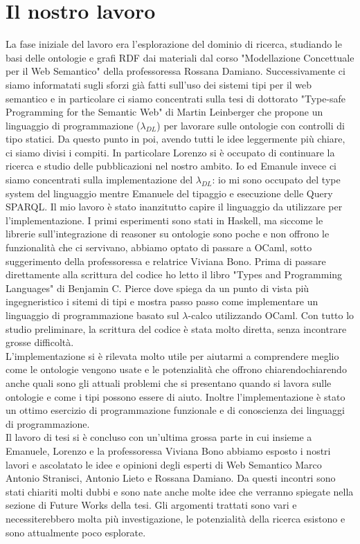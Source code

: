 \section{Il nostro lavoro}
    La fase iniziale del lavoro era l'esplorazione del dominio di ricerca,
    studiando le basi delle ontologie e grafi RDF dai materiali dal corso "Modellazione Concettuale per il Web Semantico" della professoressa Rossana Damiano.
    Successivamente ci siamo informatati sugli sforzi già fatti sull'uso dei sistemi tipi per il web semantico e in particolare ci siamo concentrati sulla tesi di
    dottorato "Type-safe Programming for the Semantic Web" di Martin Leinberger che propone un linguaggio di programmazione ($\lambda_{DL}$) per lavorare sulle ontologie con 
    controlli di tipo statici. Da questo punto in poi, avendo tutti le idee leggermente più chiare, ci siamo divisi i compiti. In particolare Lorenzo si
    è occupato di continuare la ricerca e studio delle pubblicazioni nel nostro ambito. Io ed Emanule invece ci siamo concentrati sulla implementazione
    del $\lambda_{DL}$: io mi sono occupato del type system del linguaggio mentre Emanuele del tipaggio e esecuzione delle Query SPARQL.
    Il mio lavoro è stato inanzitutto capire il linguaggio da utilizzare per l'implementazione. I primi esperimenti sono stati in Haskell, ma siccome le librerie
    sull'integrazione di reasoner su ontologie sono poche e non offrono le funzionalità che ci servivano, abbiamo optato di passare a OCaml, sotto suggerimento della professoressa e relatrice Viviana Bono. 
    Prima di passare direttamente alla scrittura del codice ho letto il libro "Types and Programming Languages" di Benjamin C. Pierce dove spiega da un punto di vista
    più ingegneristico i sitemi di tipi e mostra passo passo come implementare un linguaggio di programmazione basato sul $\lambda$-calco utilizzando OCaml.
    Con tutto lo studio preliminare, la scrittura del codice è stata molto diretta, senza incontrare grosse difficoltà.
    \\L'implementazione si è rilevata molto utile per aiutarmi a comprendere meglio come le ontologie vengono usate e le potenzialità che offrono chiarendochiarendo anche
    quali sono gli attuali problemi che si presentano quando si lavora sulle ontologie e come i tipi possono essere di aiuto. Inoltre l'implementazione è stato un ottimo
    esercizio di programmazione funzionale e di conoscienza dei linguaggi di programmazione.
    \\Il lavoro di tesi si è concluso con un'ultima grossa parte in cui insieme a Emanuele, Lorenzo e la professoressa Viviana Bono abbiamo esposto i nostri lavori e ascolatato le idee e opinioni degli esperti
    di Web Semantico Marco Antonio Stranisci, Antonio Lieto e Rossana Damiano. Da questi incontri sono stati chiariti molti dubbi e sono nate anche molte idee che verranno
    spiegate nella sezione di Future Works della tesi. Gli argomenti trattati sono vari e necessiterebbero molta più investigazione, le potenzialità della ricerca esistono
    e sono attualmente poco esplorate. 